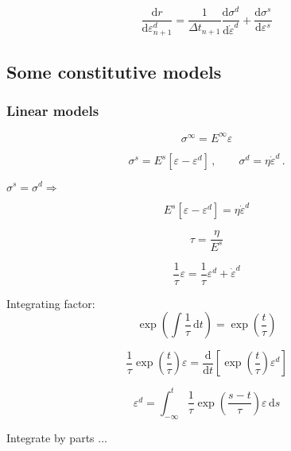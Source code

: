 \documentclass[12pt]{article}
\renewcommand{\d}{\text{d}}
\newcommand{\der}[2]{\dfrac{\text{d} #1}{\text{d} #2}}
\begin{document}
\begin{equation}
	\der{r}{\varepsilon_{n+1}^{d}} = \dfrac{1}{\Delta t_{n+1}}\der{\sigma^{d}}{\dot{\varepsilon}^{d}} + \der{\sigma^{s}}{\varepsilon^{s}}
\end{equation}

\subsection{Some constitutive models}

\subsubsection{Linear models}

\begin{equation}
	\sigma^{\infty} = E^{\infty}\varepsilon
\end{equation}

\begin{equation}
	\sigma^{s} = E^{s}\left[\varepsilon-\varepsilon^{d}\right]\,, \qquad \sigma^{d} = \eta \dot{\varepsilon}^{d}\,.
\end{equation}

$\sigma^{s} = \sigma^{d} \Rightarrow$

\begin{equation}
	E^{s}\left[\varepsilon-\varepsilon^{d}\right] = \eta \dot{\varepsilon}^{d}
\end{equation}

\begin{equation}
	\tau = \dfrac{\eta}{E^{s}}
\end{equation}

\begin{equation}
	\dfrac{1}{\tau}\varepsilon =  \dfrac{1}{\tau}\varepsilon^{d} + \dot{\varepsilon}^{d}
\end{equation}

Integrating factor:
\begin{equation}
	\exp\left(\int\dfrac{1}{\tau}\,\d t\right) = 	\exp\left(\dfrac{t}{\tau}\right) 
\end{equation}

\begin{equation}
	\dfrac{1}{\tau}\exp\left(\dfrac{t}{\tau}\right) \varepsilon =  \der{ }{t}\left[\exp\left(\dfrac{t}{\tau}\right) \varepsilon^{d} \right] 
\end{equation}

\begin{equation}
	\varepsilon^{d} = \int_{-\infty}^{t}\dfrac{1}{\tau}\exp\left(\dfrac{s-t}{\tau}\right)\varepsilon \,\d s
\end{equation}

Integrate by parts ...
\end{document}
